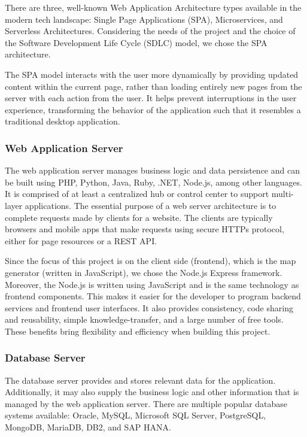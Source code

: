There are three, well-known Web Application Architecture types available in the modern tech landscape: Single Page Applications (SPA), Microservices, and Serverless Architectures. Considering the needs of the project and the choice of the Software Development Life Cycle (SDLC) model, we chose the SPA architecture.

The SPA model interacts with the user more dynamically by providing updated content within the current page, rather than loading entirely new pages from the server with each action from the user. It helps prevent interruptions in the user experience, transforming the behavior of the application such that it resembles a traditional desktop application.

\subsubsection{Web Application Server}
\label{sec:Design>Architecture Design>Web Application Server}
The web application server manages business logic and data persistence and can be built using PHP, Python, Java, Ruby, .NET, Node.js, among other languages. It is comprised of at least a centralized hub or control center to support multi-layer applications. The essential purpose of a web server architecture is to complete requests made by clients for a website. The clients are typically browsers and mobile apps that make requests using secure HTTPs protocol, either for page resources or a REST API.

Since the focus of this project is on the client side (frontend), which is the map generator (written in JavaScript), we chose the Node.js Express framework. Moreover, the Node.js is written using JavaScript and is the same technology as frontend components. This makes it easier for the developer to program backend services and frontend user interfaces. It also provides consistency, code sharing and reusability, simple knowledge-transfer, and a large number of free tools. These benefits bring flexibility and efficiency when building this project.

\subsubsection{Database Server}
\label{sec:Design>Architecture Design>Database Server}
The database server provides and stores relevant data for the application. Additionally, it may also supply the business logic and other information that is managed by the web application server. There are multiple popular database systems available: Oracle, MySQL, Microsoft SQL Server, PostgreSQL, MongoDB, MariaDB, DB2, and SAP HANA.

